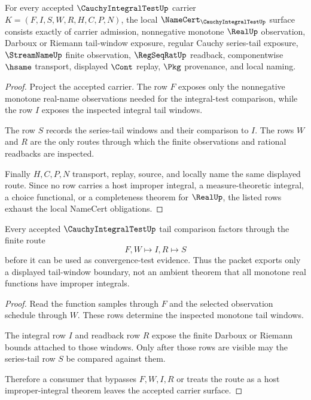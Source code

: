 \begin{theorem}
\label{thm:cauchy-integral-test-namecert-obligations}
For every accepted $\CauchyIntegralTestUp$ carrier $K=(F,I,S,W,R,H,C,P,N)$, the local $\NameCert_{\CauchyIntegralTestUp}$ surface consists exactly of carrier admission, nonnegative monotone $\RealUp$ observation, Darboux or Riemann tail-window exposure, regular Cauchy series-tail exposure, $\StreamNameUp$ finite observation, $\RegSeqRatUp$ readback, componentwise $\hsame$ transport, displayed $\Cont$ replay, $\Pkg$ provenance, and local naming.
\end{theorem}
\begin{proof}
Project the accepted carrier. The row $F$ exposes only the nonnegative monotone real-name observations needed for the integral-test comparison, while the row $I$ exposes the inspected integral tail windows.

The row $S$ records the series-tail windows and their comparison to $I$. The rows $W$ and $R$ are the only routes through which the finite observations and rational readbacks are inspected.

Finally $H,C,P,N$ transport, replay, source, and locally name the same displayed route. Since no row carries a host improper integral, a measure-theoretic integral, a choice functional, or a completeness theorem for $\RealUp$, the listed rows exhaust the local NameCert obligations.
\end{proof}

\begin{theorem}
\label{thm:cauchy-integral-test-tail-boundary}
Every accepted $\CauchyIntegralTestUp$ tail comparison factors through the finite route
$$
F,W \longmapsto I,R \longmapsto S
$$
before it can be used as convergence-test evidence. Thus the packet exports only a displayed tail-window boundary, not an ambient theorem that all monotone real functions have improper integrals.
\end{theorem}
\begin{proof}
Read the function samples through $F$ and the selected observation schedule through $W$. These rows determine the inspected monotone tail windows.

The integral row $I$ and readback row $R$ expose the finite Darboux or Riemann bounds attached to those windows. Only after those rows are visible may the series-tail row $S$ be compared against them.

Therefore a consumer that bypasses $F,W,I,R$ or treats the route as a host improper-integral theorem leaves the accepted carrier surface.
\end{proof}

